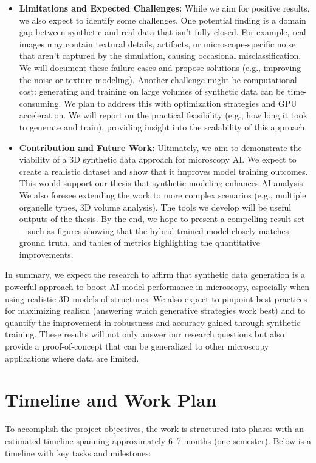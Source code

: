\documentclass[
oneside,      %
openany       %
]{imc-inf}
\begin{document}
\begin{itemize}
		\item \textbf{Limitations and Expected Challenges:} While we aim for positive results, we also expect to identify some challenges. One potential finding is a domain gap between synthetic and real data that isn’t fully closed. For example, real images may contain textural details, artifacts, or microscope-specific noise that aren't captured by the simulation, causing occasional misclassification. We will document these failure cases and propose solutions (e.g., improving the noise or texture modeling). Another challenge might be computational cost: generating and training on large volumes of synthetic data can be time-consuming. We plan to address this with optimization strategies and GPU acceleration. We will report on the practical feasibility (e.g., how long it took to generate and train), providing insight into the scalability of this approach.
		
		\item \textbf{Contribution and Future Work:} Ultimately, we aim to demonstrate the viability of a 3D synthetic data approach for microscopy AI. We expect to create a realistic dataset and show that it improves model training outcomes. This would support our thesis that synthetic modeling enhances AI analysis. We also foresee extending the work to more complex scenarios (e.g., multiple organelle types, 3D volume analysis). The tools we develop will be useful outputs of the thesis. By the end, we hope to present a compelling result set—such as figures showing that the hybrid-trained model closely matches ground truth, and tables of metrics highlighting the quantitative improvements.
	\end{itemize}
	
	In summary, we expect the research to affirm that synthetic data generation is a powerful approach to boost AI model performance in microscopy, especially when using realistic 3D models of structures. We also expect to pinpoint best practices for maximizing realism (answering which generative strategies work best) and to quantify the improvement in robustness and accuracy gained through synthetic training. These results will not only answer our research questions but also provide a proof-of-concept that can be generalized to other microscopy applications where data are limited.
	
	
	\chapter{Timeline and Work Plan}\label{chap:timeline}
	To accomplish the project objectives, the work is structured into phases with an estimated timeline spanning approximately 6–7 months (one semester). Below is a timeline with key tasks and milestones:
	
\end{document}
